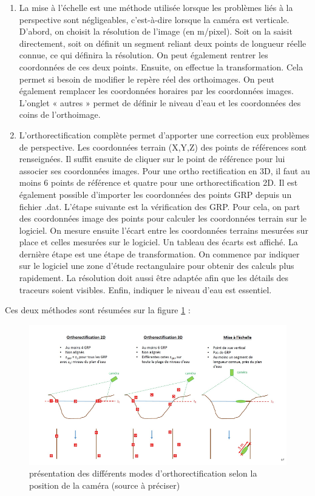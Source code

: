 \documentclass[
]{article}
\begin{document}
\begin{enumerate}
\def\labelenumi{\arabic{enumi}.}
\item
  La mise à l'échelle est une méthode utilisée lorsque les problèmes liés à la perspective sont négligeables, c'est-à-dire lorsque la caméra est verticale. D'abord, on choisit la résolution de l'image (en m/pixel). Soit on la saisit directement, soit on définit un segment reliant deux points de longueur réelle connue, ce qui définira la résolution. On peut également rentrer les coordonnées de ces deux points. Ensuite, on effectue la transformation. Cela permet si besoin de modifier le repère réel des orthoimages. On peut également remplacer les coordonnées horaires par les coordonnées images. L'onglet « autres » permet de définir le niveau d'eau et les coordonnées des coins de l'orthoimage.
\item
  L'orthorectification complète permet d'apporter une correction eux problèmes de perspective. Les coordonnées terrain (X,Y,Z) des points de références sont renseignées. Il suffit ensuite de cliquer sur le point de référence pour lui associer ses coordonnées images. Pour une ortho rectification en 3D, il faut au moins 6 points de référence et quatre pour une orthorectification 2D. Il est également possible d'importer les coordonnées des points GRP depuis un fichier .dat. L'étape suivante est la vérification des GRP. Pour cela, on part des coordonnées image des points pour calculer les coordonnées terrain sur le logiciel. On mesure ensuite l'écart entre les coordonnées terrains mesurées sur place et celles mesurées sur le logiciel. Un tableau des écarts est affiché. La dernière étape est une étape de transformation. On commence par indiquer sur le logiciel une zone d'étude rectangulaire pour obtenir des calculs plus rapidement. La résolution doit aussi être adaptée afin que les détails des traceurs soient visibles. Enfin, indiquer le niveau d'eau est essentiel.
\end{enumerate}

Ces deux méthodes sont résumées sur la figure \ref{fig:orthowang} :



\begin{figure}[H]
\includegraphics[width=1\linewidth,]{images/Orthowang} \caption{présentation des différents modes d'orthorectification selon la position de la caméra (source à préciser)}\label{fig:orthowang}
\end{figure}
\end{document}
